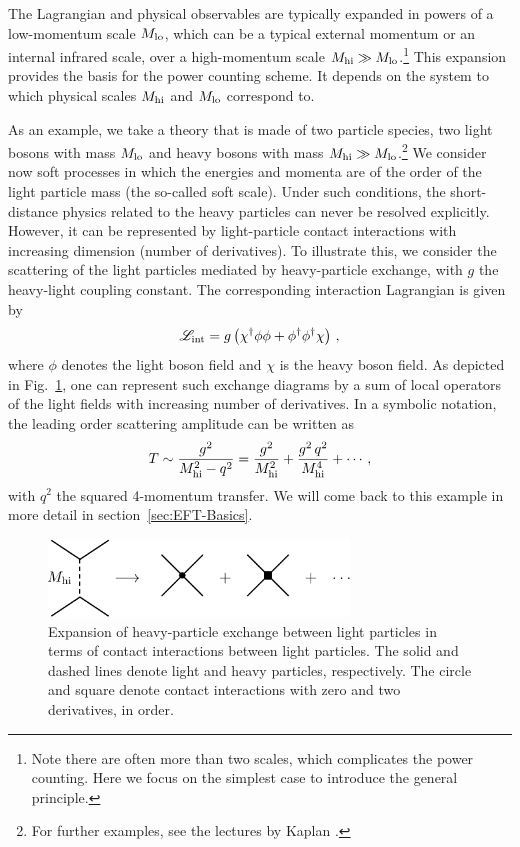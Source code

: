The Lagrangian and physical observables are typically 
expanded in powers of a low-momentum scale $M_{\rm lo}$,
which can be a typical external momentum or an internal
infrared scale, over a high-momentum scale 
$M_{\rm hi}\gg M_{\rm lo}$.\footnote{Note there are often 
more than two scales, which complicates the power counting. Here we focus on
the simplest case to introduce the general principle.}
This expansion provides the basis for the power counting scheme.
It depends on the system to which physical scales 
$M_{\rm hi}$ and $M_{\rm lo}$ correspond to.  

As an example, we take a theory that is made of two
particle species, two light bosons with mass $M_{\rm lo}$ and heavy
bosons with mass $M_{\rm hi} \gg M_{\rm lo}$.\footnote{For further examples,
see the lectures by Kaplan \cite{Kaplan:1995uv,Kaplan:2005es}.}
We consider now soft processes
in which the energies and momenta are of the order of the 
light particle mass (the so-called soft scale). 
Under such conditions, the short-distance
physics related to the heavy particles can never be resolved explicitly.
However, it can be represented by light-particle contact interactions 
with increasing dimension (number of derivatives). To illustrate this,
we consider the scattering of the light particles mediated by
heavy-particle exchange, with
$g$ the heavy-light coupling constant. The corresponding interaction
Lagrangian is given by
\begin{equation}
 {\mathcal L}_{\rm int}=g\left(\chi^\dagger \phi \phi +
 \phi^\dagger \phi^\dagger \chi\right)\,,
\end{equation}
where $\phi$ denotes the light boson field and
$\chi$ is the heavy boson field. As depicted in
Fig.~\ref{fig:resosat}, one can represent such exchange diagrams by a 
sum of local operators of the light fields with increasing
number of derivatives. In a symbolic notation, the leading order 
scattering amplitude can be written as
\begin{equation}
 T\sim \frac{g^2}{M_{\rm hi}^2 - q^2} = \frac{g^2}{M_{\rm hi}^2} + 
 \frac{g^2 \, q^2}{M_{\rm hi}^4} + \cdots \,,
\end{equation}
with $q^2$ the squared 4-momentum transfer.  We will come back
to this example in more detail in section~\ref{sec:EFT-Basics}.
\begin{figure}[tb]
\centerline{\includegraphics*[width=8cm]{BosonContact-2body-simple}}
\caption{Expansion of heavy-particle exchange
between light particles in terms of contact interactions between
light particles. The solid and dashed lines denote light and heavy
particles, respectively. The circle and square
denote contact interactions with zero and two derivatives, in order.
\label{fig:resosat}}
\end{figure}

